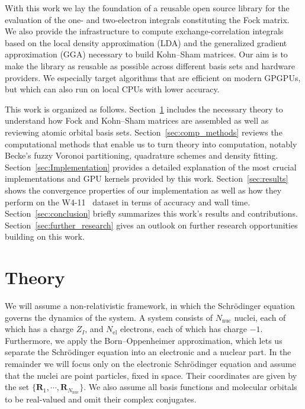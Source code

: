 \documentclass{article}
\begin{document}
With this work we lay the foundation of a reusable open source
library for the evaluation of the one- and two-electron integrals
constituting the Fock matrix. We also provide the infrastructure to
compute exchange-correlation integrals based on the local density
approximation (LDA) and the generalized gradient
approximation (GGA) necessary to build Kohn--Sham matrices. Our aim is
to make the library as reusable as possible across different basis
sets and hardware providers. We especially target algorithms that are
efficient on modern GPGPUs, but which can also run on local CPUs with
lower accuracy.

This work is organized as follows. Section~\ref{sec:theory}
includes the necessary theory to understand how Fock and Kohn--Sham
matrices are assembled as well as reviewing atomic orbital basis
sets. Section~\ref{sec:comp_methods} reviews the
computational methods that enable us to turn theory into computation,
notably Becke's fuzzy Voronoi partitioning, quadrature schemes and
density fitting.
Section~\ref{sec:Implementation} provides a detailed explanation of
the most crucial
implementations and GPU kernels provided by this work.
Section~\ref{sec:results} shows the convergence properties of our
implementation
as well as how they perform on the W4-11~\cite{Karton11w411} dataset
in terms of accuracy
and wall time. Section~\ref{sec:conclusion} briefly summarizes this
work's results and contributions. Section~\ref{sec:further_research}
gives an outlook on further research opportunities building on this work.

\section{Theory}\label{sec:theory}

We will assume a non-relativistic framework, in which the Schrödinger
equation governs the dynamics of the system. A system consists of
$N_{\text{nuc}}$ nuclei, each of which has a charge $Z_I$, and
$N_{\text{el}}$ electrons, each of which has charge $-1$.
Furthermore, we apply the Born--Oppenheimer approximation, which lets
us separate the Schrödinger equation into an electronic and a
nuclear part. In the remainder we will focus only on the electronic
Schrödinger equation and assume that the nuclei are point
particles, fixed in space. Their coordinates are given by the set
$\{\mathbf R_1, \cdots ,\mathbf{R}_{N_{\text{nuc}}}\}$. We also
assume all basis functions and molecular orbitals to be real-valued
and omit their complex conjugates.
\end{document}
